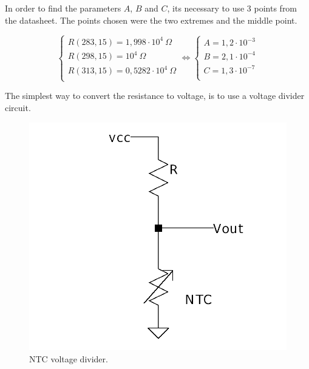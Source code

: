 \documentclass[12pt]{article}
\begin{document}
    In order to find the parameters $A$, $B$ and $C$, its necessary to use 3 points from the datasheet. 
    The points chosen were the two extremes and the middle point.

    \begin{equation}
        \begin{cases}
        
            R( 283,15 ) = 1,998\cdot 10^4 ~\Omega \\
            R( 298,15 ) = 10^4 ~\Omega\\
            R( 313,15 ) = 0,5282 \cdot 10^4 ~\Omega\\
        
        \end{cases}
        \Leftrightarrow
        \begin{cases}
            A = 1,2 \cdot 10^{-3}\\
            B = 2,1 \cdot 10^{-4}\\
            C = 1,3 \cdot 10^{-7}\\
        
        \end{cases}
    \end{equation}

    The simplest way to convert the resistance to voltage, is to use a voltage divider circuit.

   \begin{figure}[H] 
        \centering
        \includegraphics*[scale = 0.25]{images/voltagedivider.png}
        \caption{NTC voltage divider.}
        \label{wrap-fig:1}
    \end{figure}
\end{document}
